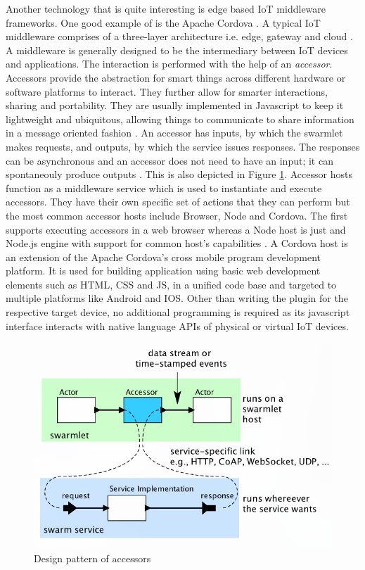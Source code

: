 Another technology that is quite interesting is edge based IoT middleware frameworks. One good example of is the 
Apache Cordova \cite{cordovahost}. A typical IoT middleware comprises of a three-layer architecture i.e. edge, gateway and cloud \cite{7582463}. 
A middleware is generally designed to be the intermediary between IoT devices and applications. The interaction is performed 
with the help of an \textit{accessor}. Accessors provide the abstraction for smart things across different hardware or 
software platforms to interact. They further allow for smarter interactions, sharing and portability. They are usually 
implemented in Javascript to keep it lightweight and ubiquitous, allowing things to communicate to share information 
in a message oriented fashion \cite{9446337}. An accessor has inputs, by which the swarmlet makes requests, and outputs, 
by which the service issues responses. The responses can be asynchronous and an accessor does not need to have an input; 
it can spontaneouly produce outputs \cite{7006378}. This is also depicted in Figure \ref{fig:accessor}. Accessor hosts function 
as a middleware service which is used to instantiate and execute accessors. They have their own specific set of actions 
that they can perform but the most common accessor hosts include Browser, Node and Cordova. The first supports 
executing accessors in a web browser whereas a Node host is just and Node.js engine with support for common host's 
capabilities \cite{9446337}. A Cordova host is an extension of the Apache Cordova's cross mobile program development 
platform. It is used for building application using basic web development elements such as HTML, CSS and JS, in a 
unified code base and targeted to multiple platforms like Android and IOS. Other than writing the plugin for the respective 
target device, no additional programming is required as its javascript interface interacts with native language APIs 
of physical or virtual IoT devices. 

\begin{figure}
    \begin{center}
        \includegraphics[scale=0.35]{Figs/accessor.png}    
    \end{center}
    \caption{Design pattern of accessors \cite{7006378}}
    \label{fig:accessor}
\end{figure}

